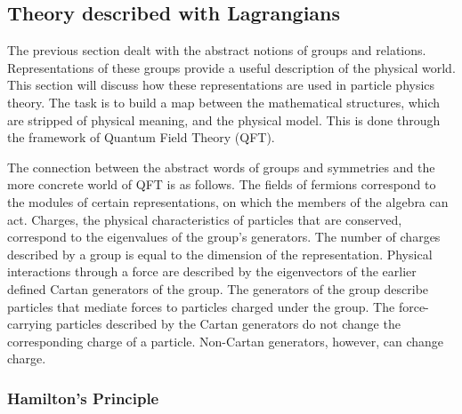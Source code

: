 \subsection{Theory described with Lagrangians}\label{sec:lagrangians}

The previous section dealt with the abstract notions of groups and relations.
Representations of these groups provide a useful description of the physical world.
This section will discuss how these representations are used in particle physics theory.
The task is to build a map between the mathematical structures, which are stripped of physical meaning, and the physical model.
This is done through the framework of Quantum Field Theory (QFT).

The connection between the abstract words of groups and symmetries and the more concrete world of QFT is as follows.
The fields of fermions correspond to the modules of certain representations, on which the members of the algebra can act.
Charges, the physical characteristics of particles that are conserved, correspond to the eigenvalues of the group's generators.
The number of charges described by a group is equal to the dimension of the representation.
Physical interactions through a force are described by the eigenvectors of the earlier defined Cartan generators of the group.
The generators of the group describe particles that mediate forces to particles charged under the group.
The force-carrying particles described by the Cartan generators do not change the corresponding charge of a particle.
Non-Cartan generators, however, can change charge.

\subsubsection{Hamilton's Principle}\label{sec:lagrangian}

